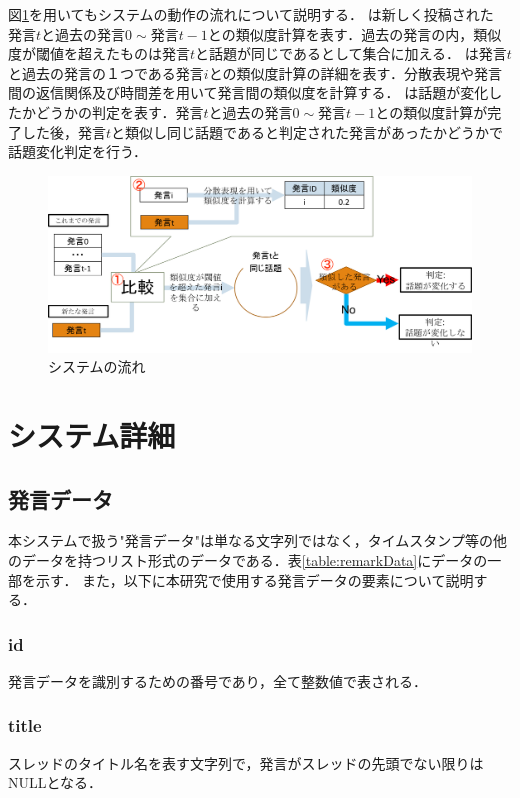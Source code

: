 図\ref{Fig:wholeModel}を用いてもシステムの動作の流れについて説明する．
は新しく投稿された$発言t$と過去の$発言0 \sim 発言t-1$との類似度計算を表す．過去の発言の内，類似度が閾値を超えたものは$発言t$と話題が同じであるとして集合に加える．
は$発言t$と過去の発言の１つである$発言i$との類似度計算の詳細を表す．分散表現や発言間の返信関係及び時間差を用いて発言間の類似度を計算する．
は話題が変化したかどうかの判定を表す．$発言t$と過去の$発言0 \sim 発言t-1$との類似度計算が完了した後，$発言t$と類似し同じ話題であると判定された発言があったかどうかで話題変化判定を行う．
\begin{figure}[htbp]
 \begin{center}
  \includegraphics[width=\textwidth]{../images/3.The_Model/WholeModel4.png}
  \caption{システムの流れ}
  \label{Fig:wholeModel}
  \vspace{-10pt}
 \end{center}
\end{figure}

\section{システム詳細}
\label{model:detail}
\subsection{発言データ}
本システムで扱う"発言データ"は単なる文字列ではなく，タイムスタンプ等の他のデータを持つリスト形式のデータである．表\ref{table:remarkData}にデータの一部を示す．
また，以下に本研究で使用する発言データの要素について説明する．
\subsubsection*{ id}
発言データを識別するための番号であり，全て整数値で表される．
\subsubsection*{ title}
スレッドのタイトル名を表す文字列で，発言がスレッドの先頭でない限りはNULLとなる．

